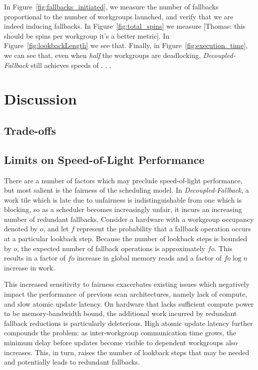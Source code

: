 \documentclass[sigconf]{acmart}
\newcommand{\thomas}[1]{{\footnotesize\color{orange}[Thomas: #1]}}
\begin{document}
In Figure~\ref{fig:fallbacks_initiated}, we measure the number of fallbacks proportional to the number of workgroups launched, and verify that we are indeed inducing fallbacks. In Figure~\ref{fig:total_spins} we measure \thomas{this should be spins per workgroup it's a better metric}. In Figure~\ref{fig:lookbackLength} we see that. Finally, in Figure~\ref{fig:execution_time}, we can see that, even when \emph{half} the workgroups are deadlocking, \emph{Decoupled-Fallback} still achieves speeds of . . .

\section{Discussion}

\subsection{Trade-offs}

\subsection{Limits on Speed-of-Light Performance}
There are a number of factors which may preclude speed-of-light performance, but most salient is the fairness of the scheduling model. In \emph{Decoupled-Fallback}, a work tile which is late due to unfairness is indistinguishable from one which is blocking, so as a scheduler becomes increasingly unfair, it incurs an increasing number of redundant fallbacks. Consider a hardware with a workgroup occupancy denoted by $o$, and let $f$ represent the probability that a fallback operation occurs at a particular lookback step. Because the number of lookback steps is bounded by $o$, the expected number of fallback operations is approximately $fo$. This results in a factor of $fo$ increase in global memory reads and a factor of $fo\log{n}$ increase in work.

This increased sensitivity to fairness exacerbates existing issues which negatively impact the performance of previous scan architectures, namely lack of compute, and slow atomic update latency. On hardware that lacks sufficient compute power to be memory-bandwidth bound, the additional work incurred by redundant fallback reductions is particularly deleterious. High atomic update latency further compounds the problem: as inter-workgroup communication time grows, the minimum delay before updates become visible to dependent workgroups also increases. This, in turn, raises the number of lookback steps that may be needed and potentially leads to redundant fallbacks.
\end{document}
